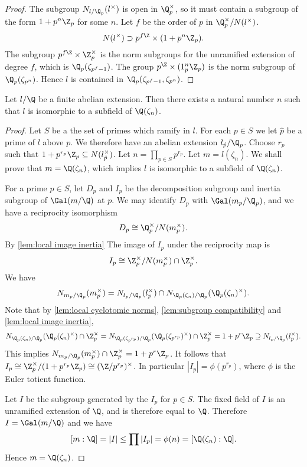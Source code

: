 \begin{proof}
	The subgroup $N_{l/\Q_p}(l^\times)$ is open in $\Q_p^\times$, so it must contain
	a subgroup of the form $1+p^n\Z_p$ for some $n$.
	Let $f$ be the order of $p$ in $\Q_p^\times / N(l^\times)$.
	\[
		N(l^\times) \supset p^{f\Z} \times (1 + p^n\Z_p).
	\]
	The subgroup $p^{f\Z} \times \Z_p^\times$ is the norm subgroups for the unramified extension
	of degree $f$, which is $\Q_p(\zeta_{p^f-1})$.
	The group $p^\Z \times (1_p^n \Z_p)$ is the norm subgroup of $\Q_p(\zeta_{p^n})$.
	Hence $l$ is contained in $\Q_p(\zeta_{p^f-1}, \zeta_{p^n})$.
\end{proof}

\begin{theorem} \label{thm:Kronecker Weber}
	Let $l/\Q$ be a finite abelian extension.
	Then there exists a natural number $n$ such that $l$ is isomorphic to
	a subfield of $\Q(\zeta_n)$.
\end{theorem}

\begin{proof}
	Let $S$ be a the set of primes which ramify in $l$.
	For each $p \in S$ we let $\hat p$ be a prime of $l$ above $p$.
	We therefore have an abelian extension $l_{\hat p} / \Q_p$.
	Choose $r_p$ such that $1+p^{r_p} \Z_p \subseteq N(l_{\hat p}^\times)$.
	Let $n = \prod_{p \in S} p^{r_p}$.
	Let $m = l(\zeta_n)$.
	We shall prove that $m = \Q(\zeta_n)$, which implies $l$ is
	isomorphic to a subfield of $\Q(\zeta_n)$.

	For a prime $p \in S$, let $D_p$ and $I_p$ be the decomposition subgroup and inertia subgroup of
	$\Gal(m/\Q)$ at $p$. We may identify $D_p$ with $\Gal(m_p / \Q_p)$, and we have a reciprocity
	isomorphism
	\[
		D_p \cong \Q_p^\times / N(m_p^\times).
	\]
	By \ref{lem:local image inertia} The image of $I_p$ under the reciprocity map is
	\[
		I_p \cong \Z_p^\times / N(m_p^\times) \cap \Z_p^\times.
	\]
	We have
	\[
		N_{m_p/\Q_p} (m_p^\times)
		=
		N_{l_p/\Q_p} (l_p^\times) \cap N_{\Q_p(\zeta_n) / \Q_p} (\Q_p(\zeta_n)^\times).
	\]
	Note that by \ref{lem:local cyclotomic norms}, \ref{lem:subgroup compatibility}
	and \ref{lem:local image inertia},
	\[
		N_{\Q_p(\zeta_n) / \Q_p} (\Q_p(\zeta_n)^\times) \cap \Z_p^\times =
		N_{\Q_p(\zeta_{p^{r_p}}) / \Q_p} (\Q_p(\zeta_{p^{r_p}})^\times) \cap \Z_p^\times =
		1+p^r \Z_p
		\supseteq N_{l_p/\Q_p} (l_p^\times).
	\]
	This implies $N_{m_p/\Q_p} (m_p^\times) \cap \Z_p^\times = 1+p^r \Z_p$.
	It follows that $I_p \cong \Z_p^\times / (1+p^{r_p} \Z_p) \cong (\Z / p^{r_p})^\times$.
	In particular $|I_p| = \phi(p^{r_p})$, where $\phi$ is the Euler totient function.

	Let $I$ be the subgroup generated by the $I_p$ for $p \in S$.
	The fixed field of $I$ is an unramified extension of $\Q$, and is therefore equal to $\Q$.
	Therefore $I = \Gal(m/\Q)$ and we have
	\[
		 [m : \Q] = |I| \le \prod |I_p| = \phi(n) = [\Q(\zeta_n) : \Q].
	\]
	Hence $m = \Q(\zeta_n)$.
\end{proof}
